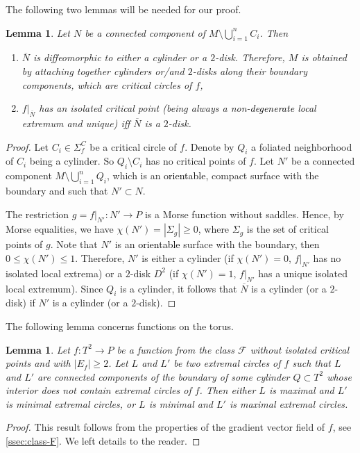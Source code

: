 \documentclass[10pt,reqno]{amsart}
\newtheorem{lemma}[subsection]{Lemma}
\newcommand{\Crit}{\Sigma_f}
\newcommand{\CritC}{\Crit^C}
\newcommand{\textr}[1]{\textcolor{black}{#1}}
\begin{document}
The following two lemmas will be needed for our proof.
\begin{lemma}\label{lm:subsuerace-N} 
	Let $N$ be a connected component of $ M\setminus \bigcup_{i = 1}^nC_i$. Then
	\begin{enumerate}
		\item $\overline{N}$ is diffeomorphic to either a cylinder or a $2$-disk. Therefore, $M$ is obtained by attaching together cylinders or/and $2$-disks along their boundary components, which are critical circles of $f$,
		\item $f|_{\overline{N}}$ has an isolated critical point {\rm(}being always a non-\textr{degenerate} local extremum and unique{\rm)} iff $\overline{N}$ is a $2$-disk. 
	\end{enumerate}
\end{lemma}
\begin{proof}
	Let $C_i\in\CritC$ be a critical circle of $f$. Denote by $Q_i$ a foliated neighborhood of $C_i$ being a cylinder. So $Q_i\setminus C_i$ has no critical points of $f$. Let $N'$ be a connected component $M\setminus \bigcup_{i = 1}^n Q_i$, which is an \textr{orientable}, compact surface with the boundary and such that $N'\subset N.$ 
	
	The restriction $g = f|_{N'}:N'\to P$ is a Morse function without saddles. 
	Hence, by Morse equalities, we have $\chi(N') = |\Sigma_{g}|\geq 0$, where $\Sigma_g$ is the set of critical points of $g$.
	Note that  $N'$ is an \textr{orientable} surface with the boundary, then $0\leq\chi(N')\leq 1$. Therefore,
	$N'$ is either a cylinder (if $\chi(N') = 0$, $f|_{N'}$ has no isolated local extrema) or a  $2$-disk $D^2$ (if $\chi(N') = 1$, $f|_{N'}$ has  a unique  isolated local extremum). 
	Since 
	$Q_i$ is a cylinder, it follows that  $\overline{N}$ is  a cylinder (or a $2$-disk) if $N'$ is a cylinder (or a $2$-disk).
\end{proof} 

The following lemma concerns functions on the torus.
{
\begin{lemma}\label{lm:torus-f}
	Let $f:T^2\to P$ be a function from the class $\mathcal{F}$ without isolated critical points and with $|E_f|\geq 2$. Let $L$ and $L'$ be two extremal circles of $f$ such that $L$ and $L'$ are connected components of the boundary of some cylinder $Q\subset T^2$ whose interior does not  contain extremal circles of $f$. Then either  $L$ is maximal and $L'$ is minimal extremal circles, or $L$ is minimal and $L'$ is maximal extremal circles.
\end{lemma} 
}
\begin{proof}
	This result follows from the properties of the gradient vector field of $f$, see \textsection\ref{ssec:class-F}. We left details to the reader.
\end{proof}
\end{document}
